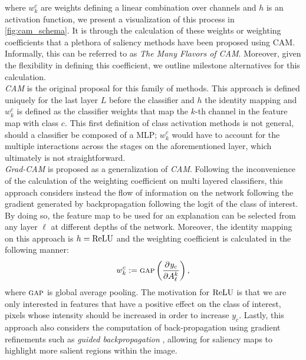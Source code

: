 where $w^c_k$ are weights defining a linear combination over channels and $h$ is an activation 
function, we present a visualization of this process in \autoref{fig:cam_schema}. It is through the 
calculation of these weights or weighting coefficients that a plethora of saliency methods have 
been proposed using CAM. Informally, this can be referred to as \emph{The Many Flavors of CAM}.
Moreover, given the flexibility in defining this coefficient, we outline milestone alternatives for 
this calculation.\\



\noindent \emph{CAM} \autocite{zhou2016learning} is the original proposal for this family of 
methods. This approach is defined uniquely for the last layer $L$ before the classifier and $h$ the 
identity mapping and $w^c_k$ is defined as the classifier weights that map the $k$-th channel in 
the feature map with class $c$. This first definition of class activation methods is not general, 
should a classifier be composed of a MLP; $w^c_k$ would have to account for the multiple 
interactions across the stages on the aforementioned layer, which ultimately is not 
straightforward. \\
 
\noindent\emph{Grad-CAM} \autocite{selvaraju2017grad} is proposed as a generalization of \emph{CAM}. 
Following the inconvenience of the calculation of the weighting coefficient on multi layered 
classifiers, this approach considers instead the flow of information on the network following the 
gradient generated by backpropagation following the logit of the class of interest. By doing so, 
the feature map to be used for an explanation can be selected from any
layer $\ell$ at different depths of the network. Moreover, the identity mapping on this approach is 
$h = {\operatorname{ReLU}} $ and the weighting coefficient is calculated in the following manner:
\begin{equation}
	w^c_k \mathrel{:=} {\textsc{gap}} \left( \frac{\partial^{}{y_c}}{\partial{{A^k_\ell}^{}}} \right),
\label{eq:gcam_coeff}
\end{equation}
where ${\textsc{gap}}$ is global average pooling.
The motivation for ${\operatorname{ReLU}}$ is that we are only interested in features that have a positive effect 
on the class of interest, \ie pixels whose intensity should be increased in order to increase $y_c$. 
Lastly, this approach also considers the computation of back-propagation using gradient refinements 
such as \emph{guided backpropagation} \autocite{guidedbackprop}, allowing for saliency maps to 
highlight more salient regions within the image.\\

